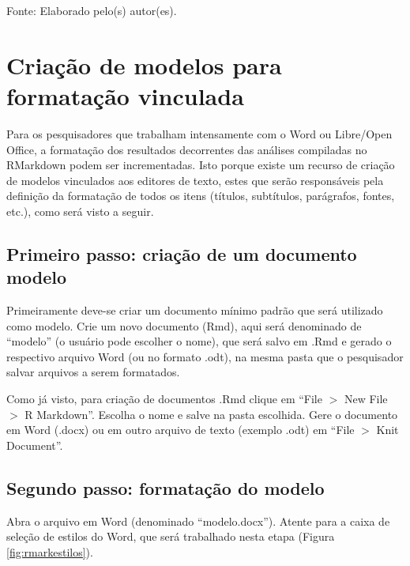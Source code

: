 \documentclass[12pt,brazil,oneside]{book}
\begin{document}
Fonte: Elaborado pelo(s) autor(es).

\hypertarget{criacao-de-modelos-para-formatacao-vinculada}{%
\section{Criação de modelos para formatação vinculada}\label{criacao-de-modelos-para-formatacao-vinculada}}

Para os pesquisadores que trabalham intensamente com o Word ou Libre/Open Office, a formatação dos resultados decorrentes das análises compiladas no RMarkdown podem ser incrementadas. Isto porque existe um recurso de criação de modelos vinculados aos editores de texto, estes que serão responsáveis pela definição da formatação de todos os itens (títulos, subtítulos, parágrafos, fontes, etc.), como será visto a seguir.

\hypertarget{primeiro-passo-criacao-de-um-documento-modelo}{%
\subsection{Primeiro passo: criação de um documento modelo}\label{primeiro-passo-criacao-de-um-documento-modelo}}

Primeiramente deve-se criar um documento mínimo padrão que será utilizado como modelo. Crie um novo documento (Rmd), aqui será denominado de ``modelo'' (o usuário pode escolher o nome), que será salvo em .Rmd e gerado o respectivo arquivo Word (ou no formato .odt), na mesma pasta que o pesquisador salvar arquivos a serem formatados.

Como já visto, para criação de documentos .Rmd clique em ``File \(>\) New File \(>\) R Markdown''. Escolha o nome e salve na pasta escolhida. Gere o documento em Word (.docx) ou em outro arquivo de texto (exemplo .odt) em ``File \(>\) Knit Document''.

\hypertarget{segundo-passo-formatacao-do-modelo}{%
\subsection{Segundo passo: formatação do modelo}\label{segundo-passo-formatacao-do-modelo}}

Abra o arquivo em Word (denominado ``modelo.docx''). Atente para a caixa de seleção de estilos do Word, que será trabalhado nesta etapa (Figura \ref{fig:rmarkestilos}).
\end{document}
